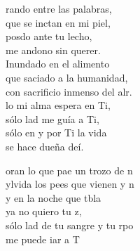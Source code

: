 \documentclass[12pt]{article}
\begin{document}
 
    \sffamily

    \portada[titulo=Cantoral, subtitulo=Grupo San Francisco]
    \newpage
    \tableofcontents
    \newpage


    \begin{multicols*}{2}
    
\begin{cancion}%
	rando entre las palabras,\\
	que se inctan en mi piel,\\
	posdo ante tu lecho,\\
	me andono sin querer.\\
Inundado en el alimento\\
	que saciado a la humanidad,\\
	con sacrificio inmenso del alr.\\

	lo mi alma espera en Ti,  \\
	sólo lad me guía a Ti, \\
	sólo en y por Ti la vida \\
	se hace dueña deí. \\

	\begin{chorus}%
	oran
	lo que pae un trozo de n\\
	ylvida
	los pees que vienen y n \\
	y en la noche que tbla \\
	ya no quiero tu z, \\
	sólo lad
	de tu sangre y tu rpo  \\
	me puede iar a T\\
	\end{chorus}%

	\siguientecolumna


\end{cancion}
\end{multicols*}
\end{document}
